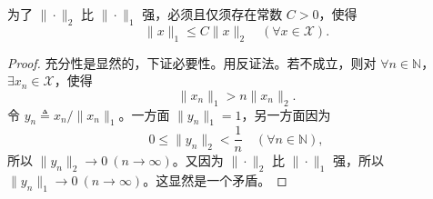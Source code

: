 \documentclass[lang=cn,newtx,10pt,scheme=chinese,thmcnt=chapter]{elegantbook}
\begin{document}
\begin{proposition}
为了 \(\|\cdot\|_2\) 比 \(\|\cdot\|_1\) 强，必须且仅须存在常数 \(C>0\)，使得
\[
\|x\|_1 \leqslant C\|x\|_2 \quad (\forall x \in \mathscr{X}).
\]
\end{proposition}

\begin{proof}
充分性是显然的，下证必要性。用反证法。若不成立，则对 \(\forall n \in \mathbb{N}\)，\(\exists x_n \in \mathscr{X}\)，使得 
\[
\|x_n\|_1 > n\|x_n\|_2.
\]
令 \(y_n \triangleq x_n / \|x_n\|_1\)。一方面 \(\|y_n\|_1 = 1\)，另一方面因为
\[
0 \leqslant \|y_n\|_2 < \frac{1}{n} \quad (\forall n \in \mathbb{N}),
\]
所以 \(\|y_n\|_2 \to 0 \ (n \to \infty)\)。又因为 \(\|\cdot\|_2\) 比 \(\|\cdot\|_1\) 强，所以 \(\|y_n\|_1 \to 0 \ (n \to \infty)\)。这显然是一个矛盾。
\end{proof}
\end{document}
